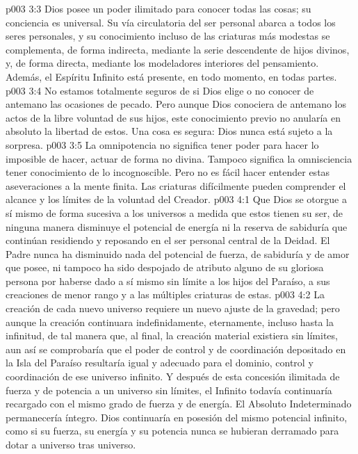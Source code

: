 \vs p003 3:3 Dios posee un poder ilimitado para conocer todas las cosas; su conciencia es universal. Su vía circulatoria del ser personal abarca a todos los seres personales, y su conocimiento incluso de las criaturas más modestas se complementa, de forma indirecta, mediante la serie descendente de hijos divinos, y, de forma directa, mediante los modeladores interiores del pensamiento. Además, el Espíritu Infinito está presente, en todo momento, en todas partes.
\vs p003 3:4 No estamos totalmente seguros de si Dios elige o no conocer de antemano las ocasiones de pecado. Pero aunque Dios conociera de antemano los actos de la libre voluntad de sus hijos, este conocimiento previo no anularía en absoluto la libertad de estos. Una cosa es segura: Dios nunca está sujeto a la sorpresa.
\vs p003 3:5 \pc La omnipotencia no significa tener poder para hacer lo imposible de hacer, actuar de forma no divina. Tampoco significa la omnisciencia tener conocimiento de lo incognoscible. Pero no es fácil hacer entender estas aseveraciones a la mente finita. Las criaturas difícilmente pueden comprender el alcance y los límites de la voluntad del Creador.
\vs p003 4:1 Que Dios se otorgue a sí mismo de forma sucesiva a los universos a medida que estos tienen su ser, de ninguna manera disminuye el potencial de energía ni la reserva de sabiduría que continúan residiendo y reposando en el ser personal central de la Deidad. El Padre nunca ha disminuido nada del potencial de fuerza, de sabiduría y de amor que posee, ni tampoco ha sido despojado de atributo alguno de su gloriosa persona por haberse dado a sí mismo sin límite a los hijos del Paraíso, a sus creaciones de menor rango y a las múltiples criaturas de estas.
\vs p003 4:2 La creación de cada nuevo universo requiere un nuevo ajuste de la gravedad; pero aunque la creación continuara indefinidamente, eternamente, incluso hasta la infinitud, de tal manera que, al final, la creación material existiera sin límites, aun así se comprobaría que el poder de control y de coordinación depositado en la Isla del Paraíso resultaría igual y adecuado para el dominio, control y coordinación de ese universo infinito. Y después de esta concesión ilimitada de fuerza y de potencia a un universo sin límites, el Infinito todavía continuaría recargado con el mismo grado de fuerza y de energía. El Absoluto Indeterminado permanecería íntegro. Dios continuaría en posesión del mismo potencial infinito, como si su fuerza, su energía y su potencia nunca se hubieran derramado para dotar a universo tras universo.

